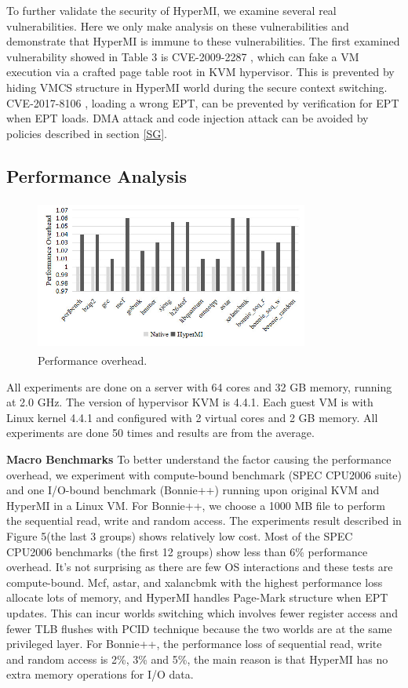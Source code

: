 \documentclass[conference]{IEEEtran}
\begin{document}
To further validate the security of HyperMI, we examine several real vulnerabilities. Here we only make analysis on these vulnerabilities and demonstrate that HyperMI is immune to these vulnerabilities. The first examined vulnerability showed in Table 3 is CVE-2009-2287 \cite{cve2009}, which can fake a VM execution via a crafted page table root in KVM hypervisor. This is prevented by hiding VMCS structure in HyperMI world during the secure context switching. CVE-2017-8106 \cite{cve2017}, loading a wrong EPT, can be prevented by verification for EPT when EPT loads. DMA attack and code injection attack can be avoided by policies described in section \ref{SG}.


\subsection{Performance Analysis}
\begin{figure}
\centerline{\includegraphics[width=9cm,height=5cm]{VMSM51.jpg}}
\caption{Performance overhead.} \label{fig5}
\end{figure}
All experiments are done on a server with 64 cores and 32 GB memory, running at 2.0 GHz. The version of hypervisor KVM is 4.4.1. Each guest VM is with Linux kernel 4.4.1 and configured with 2 virtual cores and 2 GB memory. All experiments are done 50 times and results are from the average.

\textbf{Macro Benchmarks}
To better understand the factor causing the performance overhead, we experiment with compute-bound benchmark (SPEC CPU2006 suite) and one I/O-bound benchmark (Bonnie++) running upon original KVM and HyperMI in a Linux VM. For Bonnie++, we choose a 1000 MB file to perform the sequential read, write and random access. The experiments result described in Figure 5(the last 3 groups) shows relatively low cost. Most of the SPEC CPU2006 benchmarks (the first 12 groups) show less than 6\% performance overhead. It's not surprising as there are few OS interactions and these tests are compute-bound. Mcf, astar, and xalancbmk with the highest performance loss allocate lots of memory, and HyperMI handles Page-Mark structure when EPT updates. This can incur worlds switching which involves fewer register access and fewer TLB flushes with PCID technique because the two worlds are at the same privileged layer. For Bonnie++, the performance loss of sequential read, write and random access is 2\%, 3\% and 5\%, the main reason is that HyperMI has no extra memory operations for I/O data. 
\end{document}
